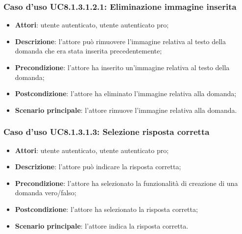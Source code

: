 	\subsubsection{Caso d'uso UC8.1.3.1.2.1: Eliminazione immagine inserita}
		\begin{itemize}
		\item
			\textbf{Attori}: utente autenticato, utente autenticato pro;
		\item		
			\textbf{Descrizione}: l'attore può rimuovere l'immagine relativa al testo della domanda che era stata inserita precedentemente;
		\item
			\textbf{Precondizione}: l'attore ha inserito un'immagine relativa al testo della domanda;
		\item
			\textbf{Postcondizione}: l'attore ha eliminato l'immagine relativa alla domanda;
		\item
			\textbf{Scenario principale}: l'attore rimuove l'immagine relativa alla domanda. 
		\end{itemize}

\subsubsection{Caso d'uso UC8.1.3.1.3: Selezione risposta corretta}
	\begin{itemize}
		\item
			\textbf{Attori}: utente autenticato, utente autenticato pro;
		\item		
			\textbf{Descrizione}: l'attore può indicare la risposta corretta;
		\item
			\textbf{Precondizione}: l'attore ha selezionato la funzionalità di creazione di una domanda vero/falso; 
		\item
			\textbf{Postcondizione}: l'attore ha selezionato la risposta corretta;
		\item
			\textbf{Scenario principale}: l'attore indica la risposta corretta.  			
	\end{itemize}